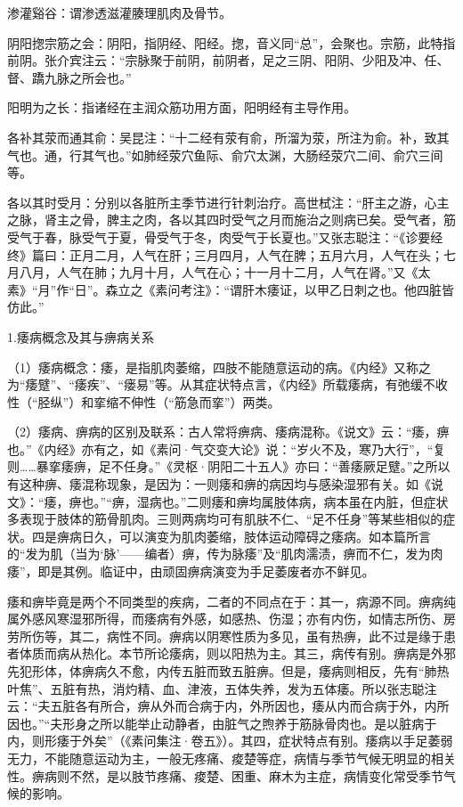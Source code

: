\documentclass[draft,12pt]{ctexbook}
\begin{document}
\begin{jiaozhu}
  \item 渗灌谿谷：谓渗透滋灌腠理肌肉及骨节。
  \item 阴阳揔宗筋之会：阴阳，指阴经、阳经。揔，音义同“总”，会聚也。宗筋，此特指前阴。张介宾注云：“宗脉聚于前阴，前阴者，足之三阴、阳阴、少阳及冲、任、督、蹻九脉之所会也。”
  \item 阳明为之长：指诸经在主润众筋功用方面，阳明经有主导作用。
  \item 各补其荥而通其俞：吴昆注：“十二经有荥有俞，所溜为荥，所注为俞。补，致其气也。通，行其气也。”如肺经荥穴鱼际、俞穴太渊，大肠经荥穴二间、俞穴三间等。
  \item 各以其时受月：分别以各脏所主季节进行针刺治疗。高世栻注：“肝主之游，心主之脉，肾主之骨，脾主之肉，各以其四时受气之月而施治之则病已矣。受气者，筋受气于春，脉受气于夏，骨受气于冬，肉受气于长夏也。”又张志聪注：“《诊要经终》篇曰：正月二月，人气在肝；三月四月，人气在脾；五月六月，人气在头；七月八月，人气在肺；九月十月，人气在心；十一月十二月，人气在肾。”又《太素》“月”作“日”。森立之《素问考注》：“谓肝木痿证，以甲乙日刺之也。他四脏皆仿此。”
\end{jiaozhu}


1.痿病概念及其与痹病关系

（1）痿病概念：痿，是指肌肉萎缩，四肢不能随意运动的病。《内经》又称之为“痿躄”、“痿疾”、“瘘易”等。从其症状特点言，《内经》所载痿病，有弛缓不收性（“胫纵”）和挛缩不伸性（“筋急而挛”）两类。

（2）痿病、痹病的区别及联系：古人常将痹病、痿病混称。《说文》云：“痿，痹也。”《内经》亦有之，如《素问·气交变大论》说：“岁火不及，寒乃大行”，“复则……暴挛痿痹，足不任身。”《灵枢·阴阳二十五人》亦曰：“善痿厥足躄。”之所以有这种痹、痿混称现象，是因为：一则痿和痹的病因均与感染湿邪有关。如《说文》：“痿，痹也。”“痹，湿病也。”二则痿和痹均属肢体病，病本虽在内脏，但症状多表现于肢体的筋骨肌肉。三则两病均可有肌肤不仁、“足不任身”等某些相似的症状。四是痹病日久，可以演变为肌肉萎缩，肢体运动障碍之痿病。如本篇所言的“发为肌（当为‘脉’——编者）痹，传为脉痿”及“肌肉濡渍，痹而不仁，发为肉痿”，即是其例。临证中，由顽固痹病演变为手足萎废者亦不鲜见。

痿和痹毕竟是两个不同类型的疾病，二者的不同点在于：其一，病源不同。痹病纯属外感风寒湿邪所得，而痿病有外感，如感热、伤湿；亦有内伤，如情志所伤、房劳所伤等，其二，病性不同。痹病以阴寒性质为多见，虽有热痹，此不过是缘于患者体质而病从热化。本节所论痿病，则以阳热为主。其三，病传有别。痹病是外邪先犯形体，体痹病久不愈，内传五脏而致五脏痹。但是，痿病则相反，先有“肺热叶焦”、五脏有热，消灼精、血、津液，五体失养，发为五体痿。所以张志聪注云：“夫五脏各有所合，痹从外而合病于内，外所因也，痿从内而合病于外，内所因也。”“夫形身之所以能举止动静者，由脏气之煦养于筋脉骨肉也。是以脏病于内，则形痿于外矣”（《素问集注·卷五》）。其四，症状特点有别。痿病以手足萎弱无力，不能随意运动为主，一般无疼痛、痠楚等症，病情与季节气候无明显的相关性。痹病则不然，是以肢节疼痛、痠楚、困重、麻木为主症，病情变化常受季节气候的影响。
\end{document}
